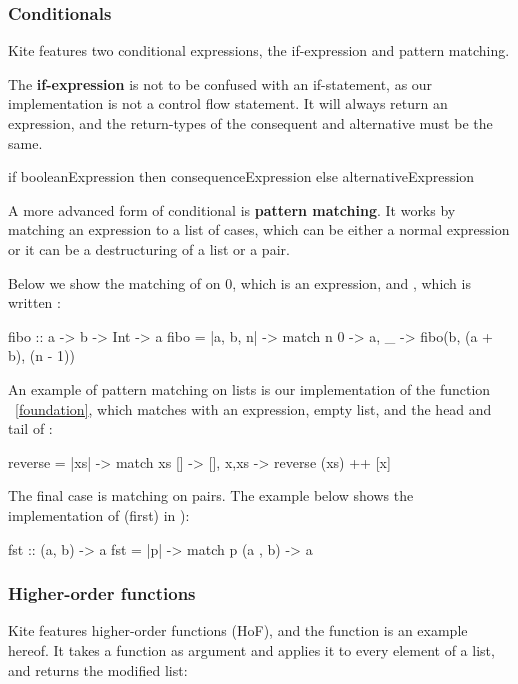 \subsubsection{Conditionals}
\label{subsubsec:conditionals}
Kite features two conditional expressions, the if-expression and pattern matching.

The \textbf{if-expression} is not to be confused with an if-statement, as our implementation is not a control flow statement. It will always return an expression, and the return-types of the consequent and alternative must be the same.

\begin{kite}
if booleanExpression then consequenceExpression else alternativeExpression
\end{kite}

A more advanced form of conditional is \textbf{pattern matching}. It works by matching an expression to a list of cases, which can be either a normal expression or it can be a destructuring of a list or a pair.

Below we show the matching of  on 0, which is an expression,
and , which is written :

\begin{kite}
fibo :: a -> b -> Int -> a
fibo = |a, b, n| -> {
    match n {
    0 -> a,
    _ -> fibo(b, (a + b), (n - 1))
    }
}
\end{kite}

An example of pattern matching on lists is our implementation of the function ~\ref{foundation}, which matches  with an expression, empty list, and the head and tail of :

\begin{kite}
reverse = |xs| -> {
  match xs {
    []    -> [],
    x,xs  -> reverse (xs) ++ [x]
  }
}
\end{kite}

The final case is matching on pairs. The example below shows the implementation of  (first) in ):
\begin{kite}
fst :: (a, b) -> a
fst = |p| -> {
  match p {
    (a , b) -> a
  }
}
\end{kite}

\subsubsection{Higher-order functions}
Kite features higher-order functions (HoF), and the  function is an example hereof. It takes a function as argument and applies it to every element of a list, and returns the modified list:

